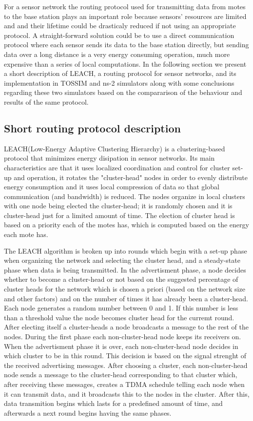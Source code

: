 For a sensor network the routing protocol used for transmitting data from motes to
the base station plays an important role because sensors' resources are limited and 
and their lifetime could be drasticaly reduced if not using an appropriate protocol.
A straight-forward solution could be to use a direct communication protocol where
each sensor sends its data to the base station directly, but sending data over a 
long distance is a very energy consuming operation, much more expensive than a series
of local computations.
In the following section we present a short description of LEACH, a routing protocol for sensor networks, and
its implementation in TOSSIM and ns-2 simulators along with some conclusions regarding 
these two simulators based on the compararison of the behaviour and results of the same protocol.  


\subsection{ Short routing protocol description}
LEACH\cite{leach-desc}(Low-Energy Adaptive Clustering Hierarchy) is a clustering-based protocol
that minimizes energy disipation in sensor networks. Its main characteristics are that
it uses localized coordination and control for cluster set-up and operation, it
rotates the "cluster-head" nodes in order to evenly distribute energy consumption and
it uses local compression of data so that global communication (and bandwidth)
is reduced.
The nodes organize in local clusters with one node being elected the cluster-head; it is randomly chosen
and it is cluster-head just for a limited amount of time. The election of cluster head
is based on a priority each of the motes has, which is computed based on the energy
each mote has.

The LEACH algorithm is broken up into rounds which begin with a set-up phase when organizing the 
network and selecting the cluster head, and a steady-state phase when data is being transmitted.
In the advertisment phase, a node decides whether to become a cluster-head or not based
on the suggested percentage of cluster heads for the network which is chosen a priori (based
on the network size and other factors) and on the number of times it has already been a cluster-head. 
Each node generates a random number between 0 and 1. If this number is less than a threshold value the node becomes cluster
head for the curremt round. After electing itself a cluster-heads  a node broadcasts a 
message to the rest of the nodes. During the first phase each non-cluster-head node keeps its receivers on.
When the advertisment phase it is over, each non-cluster-head node decides in which
cluster to be in this round. This decision is based on the signal strenght of the received advertising
messages.
After choosing a cluster, each non-cluster-head node sends a message
to the cluster-head corresponding to that cluster which, after receiving these messages,
creates a TDMA\cite{tdma} schedule telling each node when it can transmit data, and it broadcasts
this to the nodes in the cluster.
After this, data transmition begins which lasts for a predefined amount of time, and afterwards a next
round begins having the same phases.

